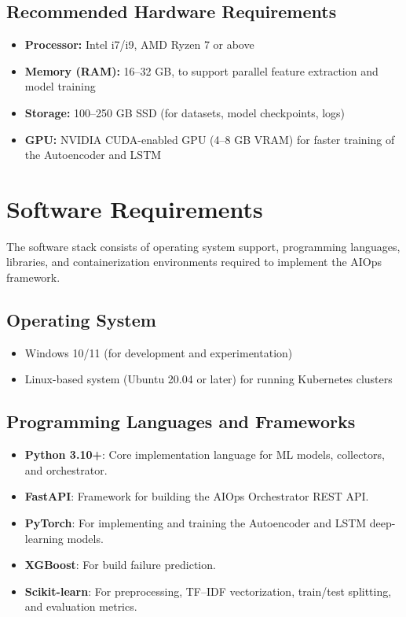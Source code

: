 \documentclass[12pt]{report}
\begin{document}
\subsection*{Recommended Hardware Requirements}
\begin{itemize}
    \item \textbf{Processor:} Intel i7/i9, AMD Ryzen 7 or above
    \item \textbf{Memory (RAM):} 16--32 GB, to support parallel feature extraction and model training
    \item \textbf{Storage:} 100--250 GB SSD (for datasets, model checkpoints, logs)
    \item \textbf{GPU:} NVIDIA CUDA-enabled GPU (4--8 GB VRAM) for faster training of the Autoencoder and LSTM
\end{itemize}


\section{Software Requirements}

The software stack consists of operating system support, programming languages, libraries, and containerization environments required to implement the AIOps framework.

\subsection*{Operating System}
\begin{itemize}
    \item Windows 10/11 (for development and experimentation)
    \item Linux-based system (Ubuntu 20.04 or later) for running Kubernetes clusters
\end{itemize}

\subsection*{Programming Languages and Frameworks}
\begin{itemize}
    \item \textbf{Python 3.10+}: Core implementation language for ML models, collectors, and orchestrator.
    \item \textbf{FastAPI}: Framework for building the AIOps Orchestrator REST API.
    \item \textbf{PyTorch}: For implementing and training the Autoencoder and LSTM deep-learning models.
    \item \textbf{XGBoost}: For build failure prediction.
    \item \textbf{Scikit-learn}: For preprocessing, TF--IDF vectorization, train/test splitting, and evaluation metrics.
\end{itemize}
\end{document}
